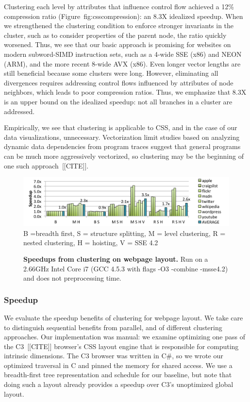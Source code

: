 \begin{itemize}
Clustering each level by attributes that influence control flow achieved a 12\% compression ratio (Figure~{fig:csscompression}): an 8.3X idealized speedup. When we strengthened the clustering condition to enforce stronger invariants in the cluster, such as to consider properties of the parent node, the ratio quickly worsened. Thus, we see that our basic approach is promising for websites on modern subword-SIMD instruction sets, such as a 4-wide SSE (x86) and NEON (ARM), and the more recent 8-wide AVX (x86). Even longer vector lengths are still beneficial because some clusters were long. However, eliminating all divergences requires addressing control flows influenced by attributes of node neighbors, which leads to poor compression ratios. Thus, we emphasize that 8.3X is an upper bound on the idealized speedup: not all branches in a cluster are addressed.
\end{itemize}

Empirically, we see that clustering is applicable to CSS, and in the case of our data visualizations, unnecessary. Vectorization limit studies based on analyzing dynamic data dependencies from program traces suggest that general programs can be much more aggressively vectorized, so clustering may be the beginning of one such approach~[[CITE]].




\begin{figure}
\centering
\includegraphics[trim=0 0 0 0,clip,width=1.0\columnwidth]{chapter6/cssspeedup4}
B =breadth first, S = structure splitting, M = level clustering, R = nested clustering, H = hoisting, V = SSE 4.2 
\caption{\textbf{Speedups from clustering on webpage layout.} Run on a 2.66GHz Intel Core i7 (GCC 4.5.3 with flags -O3 -combine -msse4.2) and does not preprocessing time.
}
\label{fig:cssspeedup}
\end{figure}

\subsubsection{Speedup}
We evaluate the speedup benefits of clustering for webpage layout. We take care to distinguish sequential benefits from parallel, and of different clustering approaches. Our implementation was manual:  we examine optimizing one pass of the C3~[[CITE]] browser's CSS layout engine that is responsible for computing intrinsic dimensions. The C3 browser was written in C\#, so we wrote our optimized traversal in C\+\+ and pinned the memory for shared access.  We use a breadth-first tree representation and schedule for our baseline, but note that doing such a layout already provides a speedup over C3's unoptimized global layout. 

